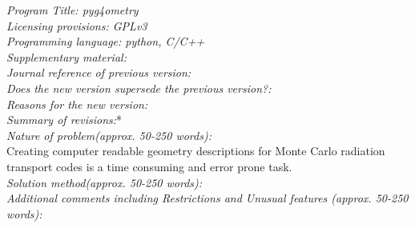 \documentclass[final,5p,times,twocolumn]{elsarticle}
\begin{document}
\begin{small}
\noindent
{\em Program Title: pyg4ometry }                                         		\\
{\em Licensing provisions: GPLv3 }			\\
{\em Programming language: python, C/C++}                         		\\

{\em Supplementary material:}                                 				\\
{\em Journal reference of previous version:}                  			\\
{\em Does the new version supersede the previous version?:}   	\\
{\em Reasons for the new version:}							\\
{\em Summary of revisions:}*								\\

{\em Nature of problem(approx. 50-250 words):}\\
Creating computer readable geometry descriptions for Monte Carlo radiation transport codes is a time consuming and error prone task.  \\
{\em Solution method(approx. 50-250 words):}\\
{\em Additional comments including Restrictions and Unusual features (approx. 50-250 words):}\\
   \\

\end{small}
\end{document}
